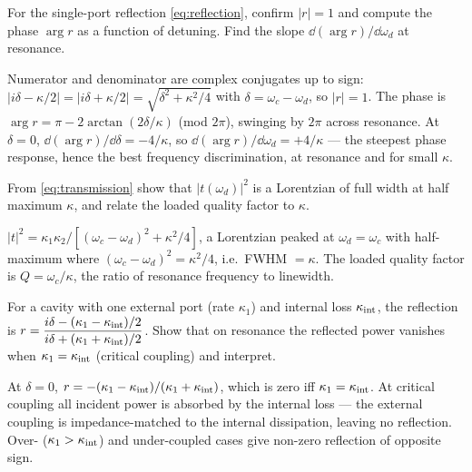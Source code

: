 \begin{exercise}
For the single-port reflection \cref{eq:reflection}, confirm $|r|=1$
and compute the phase $\arg r$ as a function of detuning. Find the
slope $\dd(\arg r)/\dd\omega_d$ at resonance.
\begin{solution}
Numerator and denominator are complex conjugates up to sign:
$|i\delta-\kappa/2|=|i\delta+\kappa/2|=\sqrt{\delta^2+\kappa^2/4}$
with $\delta=\omega_c-\omega_d$, so $|r|=1$. The phase is
$\arg r=\pi-2\arctan(2\delta/\kappa)$ (mod $2\pi$), swinging by
$2\pi$ across resonance. At $\delta=0$,
$\dd(\arg r)/\dd\delta=-4/\kappa$, so
$\dd(\arg r)/\dd\omega_d=+4/\kappa$ --- the steepest phase response,
hence the best frequency discrimination, at resonance and for small
$\kappa$.
\end{solution}
\end{exercise}

\begin{exercise}
From \cref{eq:transmission} show that $|t(\omega_d)|^2$ is a
Lorentzian of full width at half maximum $\kappa$, and relate the
loaded quality factor to $\kappa$.
\begin{solution}
$|t|^2=\kappa_1\kappa_2/[(\omega_c-\omega_d)^2+\kappa^2/4]$, a
Lorentzian peaked at $\omega_d=\omega_c$ with half-maximum where
$(\omega_c-\omega_d)^2=\kappa^2/4$, i.e.\ FWHM $=\kappa$. The loaded
quality factor is $Q=\omega_c/\kappa$, the ratio of resonance
frequency to linewidth.
\end{solution}
\end{exercise}

\begin{exercise}
For a cavity with one external port (rate $\kappa_1$) and internal
loss $\kappa_{\rm int}$, the reflection is
$r=\dfrac{i\delta-(\kappa_1-\kappa_{\rm int})/2}{i\delta+(\kappa_1+\kappa_{\rm int})/2}$.
Show that on resonance the reflected power vanishes when
$\kappa_1=\kappa_{\rm int}$ (critical coupling) and interpret.
\begin{solution}
At $\delta=0$, $r=-(\kappa_1-\kappa_{\rm int})/(\kappa_1+\kappa_{\rm int})$,
which is zero iff $\kappa_1=\kappa_{\rm int}$. At critical coupling
all incident power is absorbed by the internal loss --- the external
coupling is impedance-matched to the internal dissipation, leaving
no reflection. Over- ($\kappa_1>\kappa_{\rm int}$) and under-coupled
cases give non-zero reflection of opposite sign.
\end{solution}
\end{exercise}

